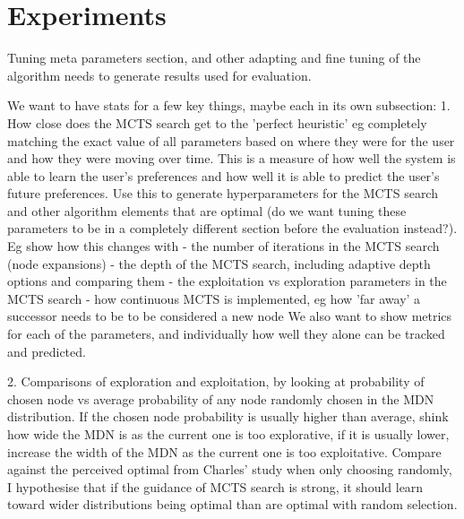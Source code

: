 \chapter{Experiments}\label{chap:experiments}

Tuning meta parameters section, and other adapting and fine tuning of the algorithm needs to generate results used for evaluation.

We want to have stats for a few key things, maybe each in its own subsection:
1. How close does the MCTS search get to the 'perfect heuristic' eg completely matching the exact value of all parameters based on where they were for the user and how they were moving over time. This is a measure of how well the system is able to learn the user's preferences and how well it is able to predict the user's future preferences. Use this to generate hyperparameters for the MCTS search and other algorithm elements that are optimal (do we want tuning these parameters to be in a completely different section before the evaluation instead?). Eg show how this changes with 
 - the number of iterations in the MCTS search (node expansions)
 - the depth of the MCTS search, including adaptive depth options and comparing them
 - the exploitation vs exploration parameters in the MCTS search
 - how continuous MCTS is implemented, eg how 'far away' a successor needs to be to be considered a new node
We also want to show metrics for each of the parameters, and individually how well they alone can be tracked and predicted.

2. Comparisons of exploration and exploitation, by looking at probability of chosen node vs average probability of any node randomly chosen in the MDN distribution. If the chosen node probability is usually higher than average, shink how wide the MDN is as the current one is too explorative, if it is usually lower, increase the width of the MDN as the current one is too exploitative. Compare against the perceived optimal from Charles' study when only choosing randomly, I hypothesise that if the guidance of MCTS search is strong, it should learn toward wider distributions being optimal than are optimal with random selection.